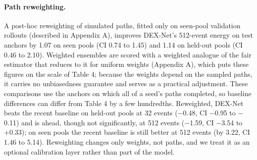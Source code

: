 \documentclass[11pt]{article}
\begin{document}
\paragraph{Path reweighting.} A post-hoc reweighting of simulated paths, fitted only on seen-pool validation rollouts (described in Appendix A), improves DEX-Net's 512-event energy on test anchors by 1.07 on seen pools (CI 0.74 to 1.45) and 1.14 on held-out pools (CI 0.46 to 2.10). Weighted ensembles are scored with a weighted analogue of the fair estimator that reduces to it for uniform weights (Appendix A), which puts these figures on the scale of Table 4; because the weights depend on the sampled paths, it carries no unbiasedness guarantee and serves as a practical adjustment. These comparisons use the anchors on which all of a seed's paths completed, so baseline differences can differ from Table 4 by a few hundredths. Reweighted, DEX-Net beats the recent baseline on held-out pools at 32 events (\ensuremath{-}0.48, CI \ensuremath{-}0.95 to \ensuremath{-}0.11) and is ahead, though not significantly, at 512 events (\ensuremath{-}1.59, CI \ensuremath{-}3.54 to +0.33); on seen pools the recent baseline is still better at 512 events (by 3.22, CI 1.46 to 5.14). Reweighting changes only weights, not paths, and we treat it as an optional calibration layer rather than part of the model.
\end{document}
